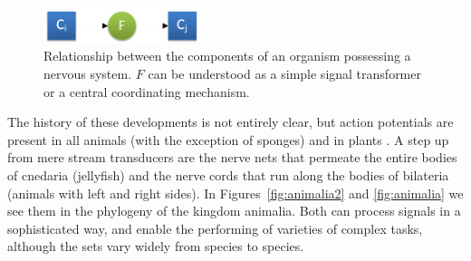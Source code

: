 \begin{figure}[t]
	\centering
	\includegraphics[width=0.4\textwidth]{Figs/nervousSystem.png}
	\caption{Relationship between the components of an organism possessing a nervous system. $F$ can be understood as a simple signal transformer or a central coordinating mechanism.}
	\label{fig:nervousSystem}
\end{figure}

The history of these developments is not entirely clear, but action potentials are present in all animals (with the exception of sponges) and in plants \cite{Leys01051999, PCE:PCE1614}. 
A step up from mere stream transducers are the nerve nets that permeate the entire bodies of cnedaria (jellyfish) and the nerve cords that run along the bodies of bilateria (animals with left and right sides). In Figures~\ref{fig:animalia2} and \ref{fig:animalia} we see them in the phylogeny of the kingdom animalia. Both can process signals in a sophisticated way, and enable the performing of varieties of complex tasks, although the sets vary widely from species to species.

